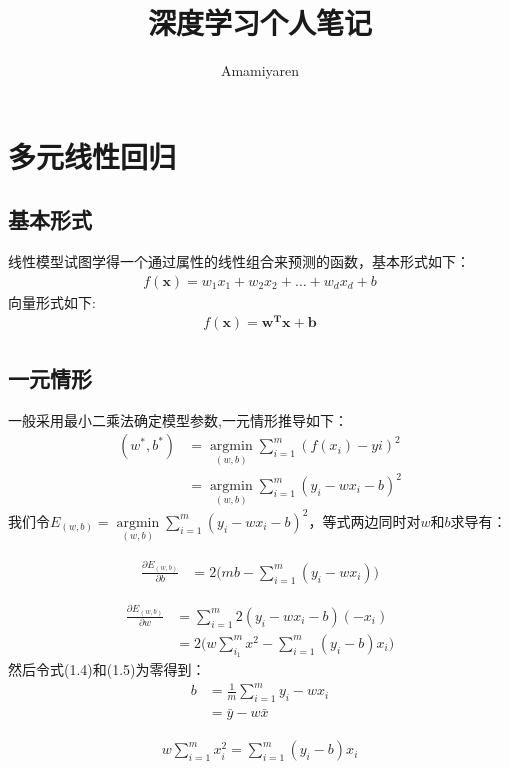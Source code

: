 \documentclass[cn,hazy,blue,14pt,normal]{elegantnote}
\title{深度学习个人笔记}
\author{Amamiyaren}
\institute{my own deep learning notes}
\date{\zhdate{2024/5/17}}
\begin{document}
\maketitle
{}
\section{多元线性回归}

\subsection{基本形式}
线性模型试图学得一个通过属性的线性组合来预测的函数，基本形式如下：
\begin{align}
    f(\textbf{x})=w_1x_1+w_2x_2+\dots+w_dx_d+b
\end{align}
向量形式如下:
\begin{align}
    f(\textbf{x})=\textbf{w}^{\textbf{T}}\textbf{x}+\textbf{b}
\end{align}
\subsection{一元情形}
一般采用最小二乘法确定模型参数,一元情形推导如下：
\begin{align}
  (w^*,b^*) &= \mathop{\arg\min}\limits_{(w,b)}\sum_{i=1}^{m}{(f(x_i)-yi)^2}\nonumber\\&=\mathop{\arg\min}\limits_{(w,b)}\sum_{i=1}^{m}{(y_i-wx_i-b)^2}
 \end{align}
 我们令$E_{(w,b)}=\mathop{\arg\min}\limits_{(w,b)}\sum_{i=1}^{m}{(y_i-wx_i-b)^2}$，等式两边同时对$w$和$b$求导有：
 
 \begin{align}
  \frac{\partial E_{(w,b)}}{\partial b} &=2\Big(mb- \sum_{i=1}^m(y_i-wx_i)\Big)
\end{align}

\begin{align}
  \frac{\partial E_{(w,b)}}{\partial w} &= \sum_{i=1}^{m}2(y_i-wx_i-b)(-x_i) \nonumber \\ &= 2 \Big (w\sum_{i_1}^mx^2-\sum_{i=1}^m(y_i-b)x_i\Big )
\end{align}
然后令式(1.4)和(1.5)为零得到：
\begin{align}
  b&=\frac{1}{m}\sum_{i=1}^my_i-wx_i \nonumber\\&=\bar{y}-w\bar{x}\
\end{align}

\begin{align}
  w\sum_{i=1}^m{x_i^2}=\sum_{i=1}^m{(y_i-b)x_i}
\end{align}
\end{document}
